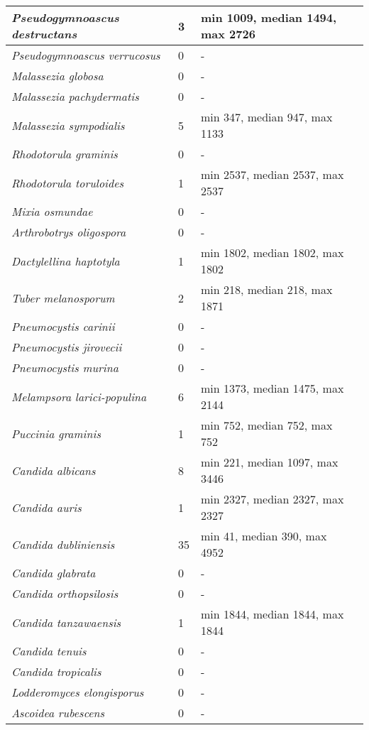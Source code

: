 {\begin{longtable}{| L{4cm} | L{2cm}  | L{5cm} | L{4cm} |}
\textit{Pseudogymnoascus destructans} & 3 & min 1009, median 1494, max 2726 & \\ \hline
\textit{Pseudogymnoascus verrucosus} & 0 & - & \\ \hline
\textit{Malassezia globosa} & 0 & - & \\ \hline
\textit{Malassezia pachydermatis} & 0 & - & \\ \hline
\textit{Malassezia sympodialis} & 5 & min 347, median 947, max 1133 & \\ \hline
\textit{Rhodotorula graminis} & 0 & - & \\ \hline
\textit{Rhodotorula toruloides} & 1 & min 2537, median 2537, max 2537 & \\ \hline
\textit{Mixia osmundae} & 0 & - & \\ \hline
\textit{Arthrobotrys oligospora} & 0 & - & \\ \hline
\textit{Dactylellina haptotyla} & 1 & min 1802, median 1802, max 1802 & \\ \hline
\textit{Tuber melanosporum} & 2 & min 218, median 218, max 1871 & \\ \hline
\textit{Pneumocystis carinii} & 0 & - & \\ \hline
\textit{Pneumocystis jirovecii} & 0 & - & \\ \hline
\textit{Pneumocystis murina} & 0 & - & \\ \hline
\textit{Melampsora larici-populina} & 6 & min 1373, median 1475, max 2144 & \\ \hline
\textit{Puccinia graminis} & 1 & min 752, median 752, max 752 & \\ \hline
\textit{Candida albicans} & 8 & min 221, median 1097, max 3446 & \\ \hline
\textit{Candida auris} & 1 & min 2327, median 2327, max 2327 & \\ \hline
\textit{Candida dubliniensis} & 35 & min 41, median 390, max 4952 & \\ \hline
\textit{Candida glabrata} & 0 & - & \\ \hline
\textit{Candida orthopsilosis} & 0 & - & \\ \hline
\textit{Candida tanzawaensis} & 1 & min 1844, median 1844, max 1844 & \\ \hline
\textit{Candida tenuis} & 0 & - & \\ \hline
\textit{Candida tropicalis} & 0 & - & \\ \hline
\textit{Lodderomyces elongisporus} & 0 & - & \\ \hline
\textit{Ascoidea rubescens} & 0 & - & \\ \hline

\end{longtable}}
